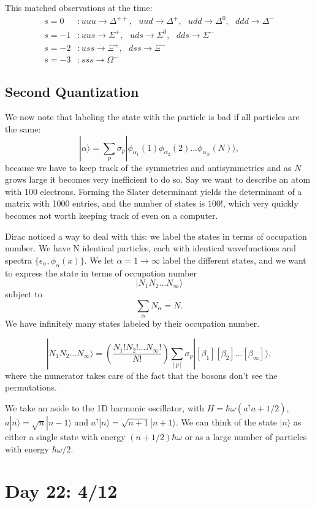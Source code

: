 \documentclass[fontsize=12pt]{scrartcl}
\newcommand{\ra}{\rangle}
\begin{document}
This matched observations at the time: \begin{align*}
s=0&: uuu\to \Delta^{++}, \ \ \ uud\to \Delta^+, \ \ \ udd \to \Delta^0, \ \ \ ddd\to \Delta^-\\
s=-1&: uus\to\Sigma^+, \ \ \ uds\to \Sigma^0, \ \ \ dds\to\Sigma^-\\
s=-2&: uss\to \Xi^+, \ \ \ dss\to\Xi^-\\
s=-3&: sss\to\Omega^-
\end{align*}

\subsection{Second Quantization}

We now note that labeling the state with the particle is bad if all particles are the same: $$|\alpha\ra = \sum_p \sigma_p|\phi_{\alpha_1}(1)\phi_{\alpha_2}(2)\dots\phi_{\alpha_N}(N)\ra,$$ because we have to keep track of the symmetries and antisymmetries and as $N$ grows large it becomes very inefficient to do so. Say we want to describe an atom with 100 electrons. Forming the Slater determinant yields the determinant of a matrix with 1000 entries, and the number of states is $100!$, which very quickly becomes not worth keeping track of even on a computer.

Dirac noticed a way to deal with this: we label the states in terms of occupation number. We have N identical particles, each with identical wavefunctions and spectra $\{\epsilon_\alpha,\phi_\alpha(x)\}$. We let $\alpha=1\to\infty$ label the different states, and we want to express the state in terms of occupation number $$|N_1N_2\dots N_\infty\ra$$ subject to $$\sum_{\alpha}N_\alpha=N.$$ We have infinitely many states labeled by their occupation number.

$$|N_1N_2\dots N_\infty\ra = \left(\frac{N_1!N_2!\dots N_\infty!}{N!}\right) \sum_{[p]}\sigma_p |[\beta_1][\beta_2]\dots[\beta_\infty]\ra,$$ where the numerator takes care of the fact that the bosons don't see the permutations.

We take an aside to the 1D harmonic oscillator, with $H=\hbar\omega(a^\dagger a+1/2)$, $a|n\ra = \sqrt{n}|n-1\ra$ and $a^\dagger|n\ra = \sqrt{n+1}|n+1\ra$. We can think of the state $|n\ra$ as either a single state with energy $(n+1/2)\hbar\omega$ or as a large number of particles with energy $\hbar\omega/2$.


\section{Day 22: 4/12}
\end{document}
